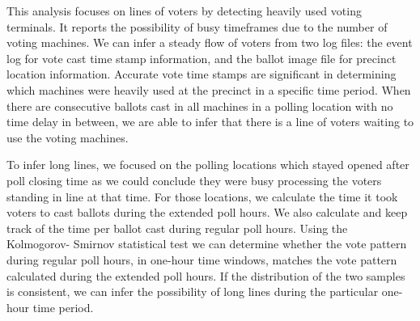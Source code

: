 This analysis focuses on lines of voters by detecting heavily used voting terminals. It reports the possibility of busy timeframes due to the number of voting machines. We can infer a steady flow of voters from two log files: the event log for vote cast time stamp information, and the ballot image file for precinct location information. Accurate vote time stamps are significant in determining which machines were heavily used at the precinct in a specific time period. When there are consecutive ballots cast in all machines in a polling location with no time delay in between, we are able to infer that there is a line of voters waiting to use the voting machines. 

To infer long lines, we focused on the polling locations which stayed opened after poll closing time as we could conclude they were busy processing the voters standing in line at that time. For those locations, we calculate the time it took voters to cast ballots during the extended poll hours. We also calculate and keep track of the time per ballot cast during regular poll hours. Using the Kolmogorov- Smirnov statistical test we can determine whether the vote pattern during regular poll hours, in one-hour time windows, matches the vote pattern calculated during the extended poll hours. If the distribution of the two samples is consistent, we can infer the possibility of long lines during the particular one-hour time period.
